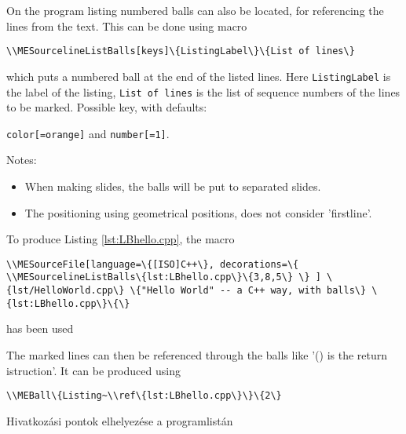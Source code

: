 {
On the program listing numbered balls can also be located, for referencing the 
lines from the text. This can be done using macro
\par\noindent\lstinline|\\MESourcelineListBalls[keys]\{ListingLabel\}\{List of lines\}|
\par\noindent which puts a numbered ball at the end of the listed lines.
Here \lstinline|ListingLabel| is the label of the listing, \lstinline|List of lines|
is the list of sequence numbers of the lines to be marked.
Possible key, with defaults:
\par\noindent\lstinline|color[=orange]| and \lstinline|number[=1]|. 


Notes:
\begin{itemize}
\item When making slides, the balls will be put to separated slides.
\item The positioning using geometrical positions, does not consider 'firstline'.
\end{itemize}

To produce Listing \ref{lst:LBhello.cpp}, the macro

\par\noindent\lstinline|\\MESourceFile[language=\{[ISO]C++\},
decorations=\{
\\MESourcelineListBalls\{lst:LBhello.cpp\}\{3,8,5\}
\}
] \{lst/HelloWorld.cpp\} \{"Hello World" -- a C++ way, with balls\} \{lst:LBhello.cpp\}\{\}|
\par\noindent has been used


The marked lines can then be referenced through the balls like '()
is the return istruction'. It can be produced using 
\par\noindent\lstinline|\\MEBall\{Listing~\\ref\{lst:LBhello.cpp\}\}\{2\}|
}
{Hivatkozási pontok elhelyezése a programlistán}
